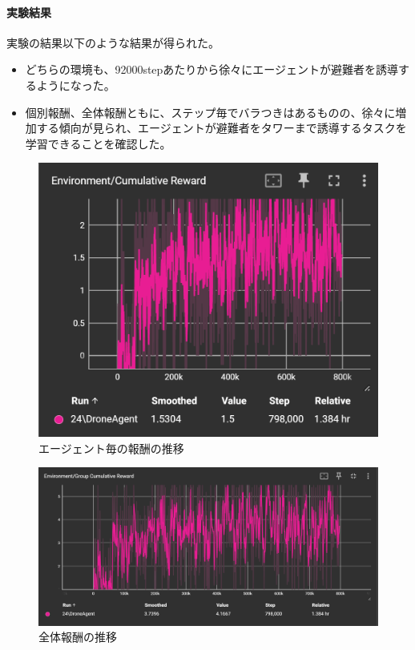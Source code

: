 \documentclass{article}[jsarticle]
\begin{document}
\paragraph{実験結果}
実験の結果以下のような結果が得られた。
\begin{itemize}
    \item どちらの環境も、92000stepあたりから徐々にエージェントが避難者を誘導するようになった。
    \item 個別報酬、全体報酬ともに、ステップ毎でバラつきはあるものの、徐々に増加する傾向が見られ、エージェントが避難者をタワーまで誘導するタスクを学習できることを確認した。
\end{itemize}
\begin{figure}[H]
    \centering
    \includegraphics[scale=0.6]{./images/result-1.png}
    \caption{
       エージェント毎の報酬の推移
    }
\end{figure}
\begin{figure}[H]
    \centering
    \includegraphics[scale=0.4]{./images/result-2.png}
    \caption{
       全体報酬の推移
    }
\end{figure}
\end{document}
